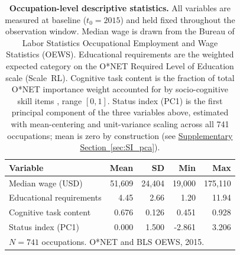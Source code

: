 \begin{table}[H]
\centering
\caption{\textbf{Occupation-level descriptive statistics.} All variables are measured at baseline ($t_0 = 2015$) and held fixed throughout the observation window. Median wage is drawn from the Bureau of Labor Statistics Occupational Employment and Wage Statistics (OEWS). Educational requirements are the weighted expected category on the O*NET Required Level of Education scale (Scale~RL). Cognitive task content is the fraction of total O*NET importance weight accounted for by socio-cognitive skill items \parencite{alabdulkareem_unpacking_2018}, range $[0,1]$. Status index (PC1) is the first principal component of the three variables above, estimated with mean-centering and unit-variance scaling across all 741 occupations; mean is zero by construction (see \hyperref[sec:SI_pca]{Supplementary Section~\ref*{sec:SI_pca}}).}
\label{tab:SI_occ_desc}
\begin{tabular}{lrrrr}
\toprule
Variable & Mean & SD & Min & Max \\
\midrule
Median wage (USD) & 51{,}609 & 24{,}404 & 19{,}000 & 175{,}110 \\
Educational requirements & 4.45 & 2.66 & 1.20 & 11.94 \\
Cognitive task content & 0.676 & 0.126 & 0.451 & 0.928 \\
Status index (PC1) & 0.000 & 1.500 & -2.861 & 3.206 \\
\bottomrule
\multicolumn{5}{l}{\footnotesize $N = 741$ occupations. O*NET and BLS OEWS, 2015.}
\end{tabular}
\end{table}
